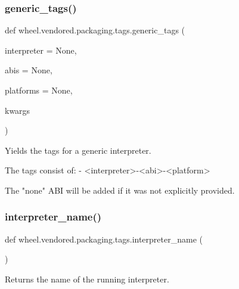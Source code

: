 \subsubsection{\texorpdfstring{generic\+\_\+tags()}{generic\_tags()}}
{\footnotesize\ttfamily def wheel.\+vendored.\+packaging.\+tags.\+generic\+\_\+tags (\begin{DoxyParamCaption}\item[{}]{interpreter = {\ttfamily None},  }\item[{}]{abis = {\ttfamily None},  }\item[{}]{platforms = {\ttfamily None},  }\item[{}]{kwargs }\end{DoxyParamCaption})}

\begin{DoxyVerb}Yields the tags for a generic interpreter.

The tags consist of:
- <interpreter>-<abi>-<platform>

The "none" ABI will be added if it was not explicitly provided.
\end{DoxyVerb}
 \mbox{\label{namespacewheel_1_1vendored_1_1packaging_1_1tags_aeb0ded3973cb6f890ce2f924c58e72ec}} 
\subsubsection{\texorpdfstring{interpreter\+\_\+name()}{interpreter\_name()}}
{\footnotesize\ttfamily def wheel.\+vendored.\+packaging.\+tags.\+interpreter\+\_\+name (\begin{DoxyParamCaption}{ }\end{DoxyParamCaption})}

\begin{DoxyVerb}Returns the name of the running interpreter.
\end{DoxyVerb}
 \mbox{\label{namespacewheel_1_1vendored_1_1packaging_1_1tags_a61301b2e3c1f29c718bba218a5956c59}} 
